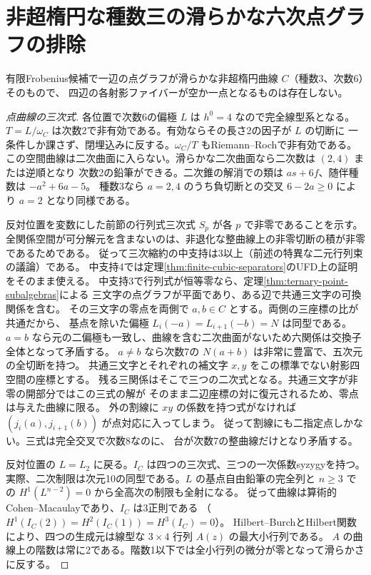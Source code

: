 \section{非超楕円な種数三の滑らかな六次点グラフの排除}
\label{sec:nonhyperelliptic-sextic-exclusion}
\begin{theorem}\label{thm:nonhyperelliptic-sextic-exclusion}
有限Frobenius候補で一辺の点グラフが滑らかな非超楕円曲線 $C$（種数3、次数6）そのもので、
四辺の各射影ファイバーが空か一点となるものは存在しない。
\end{theorem}
\begin{proof}[点曲線の三次式]
各位置で次数6の偏極 $L$ は $h^0=4$ なので完全線型系となる。
$T=L/\omega_C$ は次数2で非有効である。有効ならその長さ2の因子が $L$ の切断に
一条件しか課さず、閉埋込みに反する。$\omega_C/T$ もRiemann--Rochで非有効である。
この空間曲線は二次曲面に入らない。滑らかな二次曲面なら二次数は $(2,4)$ または逆順となり
次数2の鉛筆ができる。二次錐の解消での類は $as+6f$、随伴種数は $-a^2+6a-5$。
種数3なら $a=2,4$ のうち負切断との交叉 $6-2a\ge0$ により $a=2$ となり同様である。

反対位置を変数にした前節の行列式三次式 $S_p$ が各 $p$ で非零であることを示す。
全関係空間が可分解元を含まないのは、非退化な整曲線上の非零切断の積が非零であるためである。
従って三次縮約の中支持は3以上（前述の特異な二元行列束の議論）である。
中支持4では定理\ref{thm:finite-cubic-separators}のUFD上の証明をそのまま使える。
中支持3で行列式が恒等零なら、定理\ref{thm:ternary-point-subalgebras}による
三文字の点グラフが平面であり、ある辺で共通三文字の可換関係を含む。
その三文字の零点を両側で $a,b\in C$ とする。両側の三座標の比が共通だから、
基点を除いた偏極 $L_i(-a)=L_{i+1}(-b)=N$ は同型である。
$a=b$ なら元の二偏極も一致し、曲線を含む二次曲面がないため六関係は交換子全体となって矛盾する。
$a\ne b$ なら次数7の $N(a+b)$ は非常に豊富で、五次元の全切断を持つ。
共通三文字とそれぞれの補文字 $x,y$ をこの標準でない射影四空間の座標とする。
残る三関係はそこで三つの二次式となる。共通三文字が非零の開部分ではこの三式の解が
そのまま二辺座標の対に復元されるため、零点は与えた曲線に限る。
外の割線に $xy$ の係数を持つ式がなければ $(j_i(a),j_{i+1}(b))$ が点対応に入ってしまう。
従って割線にも二指定点しかない。三式は完全交叉で次数8なのに、
台が次数7の整曲線だけとなり矛盾する。

反対位置の $L=L_2$ に戻る。$I_C$ は四つの三次式、三つの一次係数syzygyを持つ。
実際、二次制限は次元10の同型である。$L$ の基点自由鉛筆の完全列と
$n\ge3$ での $H^1(L^{n-2})=0$ から全高次の制限も全射になる。
従って曲線は算術的Cohen--Macaulayであり、$I_C$ は3正則である
（$H^1(I_C(2))=H^2(I_C(1))=H^3(I_C)=0$）。
Hilbert--BurchとHilbert関数により、四つの生成元は線型な $3\times4$ 行列 $A(z)$ の最大小行列である。
$A$ の曲線上の階数は常に2である。階数1以下では全小行列の微分が零となって滑らかさに反する。
\end{proof}

